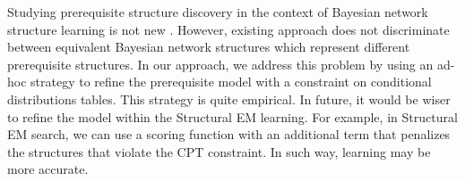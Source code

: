 \documentclass{edm_template}
\newcommand{\hl}[1]{\colorbox{yellow}{#1}}
\begin{document}
{	%
	
	Studying prerequisite structure discovery in the context of Bayesian network structure learning is not new \cite{scheines2014discovering}.
	However, existing approach does not discriminate between equivalent Bayesian network structures which represent different prerequisite structures.
	In our approach, we address this problem by using an ad-hoc strategy to refine the prerequisite model with a constraint on conditional distributions tables. 
	This strategy is quite empirical.
	In future, it would be wiser to refine the model within the Structural EM learning. 
	For example, in Structural EM search, we can use a scoring function with an additional term that penalizes the structures that violate the CPT constraint. 
	In such way, learning may be more accurate.
	

	
}
\end{document}
